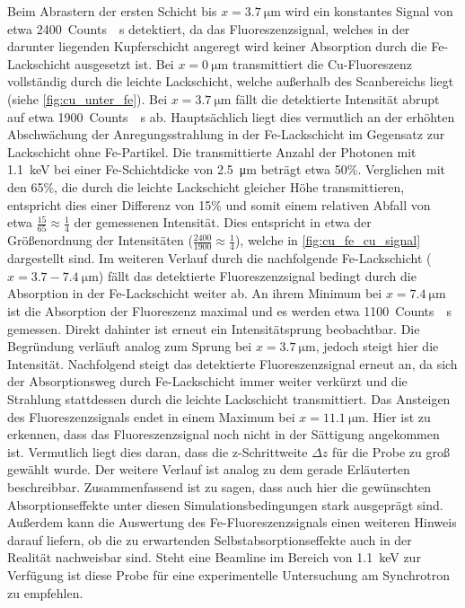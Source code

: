 Beim Abrastern der ersten Schicht bis $x=\SI{3.7}{\micro\meter}$ wird ein konstantes Signal von etwa \SI{2400}{Counts \per\second} detektiert, da das Fluoreszenzsignal, welches in der darunter liegenden Kupferschicht angeregt wird keiner Absorption durch die Fe-Lackschicht ausgesetzt ist. Bei $x=\SI{0}{\micro\meter}$ transmittiert die Cu-Fluoreszenz vollständig durch die leichte Lackschicht, welche außerhalb des Scanbereichs liegt (siehe \cref{fig:cu_unter_fe}). Bei $x=\SI{3.7}{\micro\meter}$ fällt die detektierte Intensität abrupt auf etwa \SI{1900}{Counts \per\second} ab. Hauptsächlich liegt dies vermutlich an der erhöhten Abschwächung der Anregungsstrahlung in der Fe-Lackschicht im Gegensatz zur Lackschicht ohne Fe-Partikel. Die transmittierte Anzahl der Photonen mit \SI{1.1}{\kilo\electronvolt} bei einer Fe-Schichtdicke von \SI{2.5}{\micro\meter} beträgt etwa 50\%. Verglichen mit den 65\%, die durch die leichte Lackschicht gleicher Höhe transmittieren, entspricht dies einer Differenz von 15\% und somit einem relativen Abfall von etwa $\frac{15}{65} \approx \frac{1}{4}$ der gemessenen Intensität. Dies entspricht in etwa der Größenordnung der Intensitäten ($\frac{2400}{1900} \approx \frac{1}{4}$), welche in \cref{fig:cu_fe_cu_signal} dargestellt sind. Im weiteren Verlauf durch die nachfolgende Fe-Lackschicht ($x=3.7-\SI{7.4}{\micro\meter}$) fällt das detektierte Fluoreszenzsignal bedingt durch die Absorption in der Fe-Lackschicht weiter ab. An ihrem Minimum bei $x=\SI{7.4}{\micro\meter}$ ist die Absorption der Fluoreszenz maximal und es werden etwa \SI{1100}{Counts \per\second} gemessen. Direkt dahinter ist erneut ein Intensitätsprung beobachtbar. Die Begründung verläuft analog zum Sprung bei $x=\SI{3.7}{\micro\meter}$, jedoch steigt hier die Intensität. Nachfolgend steigt das detektierte Fluoreszenzsignal erneut an, da sich der Absorptionsweg durch Fe-Lackschicht immer weiter verkürzt und die Strahlung stattdessen durch die leichte Lackschicht transmittiert. Das Ansteigen des Fluoreszenzsignals endet in einem Maximum bei $x=\SI{11.1}{\micro\meter}$. Hier ist zu erkennen, dass das Fluoreszenzsignal noch nicht in der Sättigung angekommen ist. Vermutlich liegt dies daran, dass die z-Schrittweite $\Delta z$ für die Probe zu groß gewählt wurde. Der weitere Verlauf ist analog zu dem gerade Erläuterten beschreibbar. \newlines
Zusammenfassend ist zu sagen, dass auch hier die gewünschten Absorptionseffekte unter diesen Simulationsbedingungen stark ausgeprägt sind. Außerdem kann die Auswertung des Fe-Fluoreszenzsignals einen weiteren Hinweis darauf liefern, ob die zu erwartenden Selbstabsorptionseffekte auch in der Realität nachweisbar sind. Steht eine Beamline im Bereich von \SI{1.1}{\kilo\electronvolt} zur Verfügung ist diese Probe für eine experimentelle Untersuchung am Synchrotron zu empfehlen.